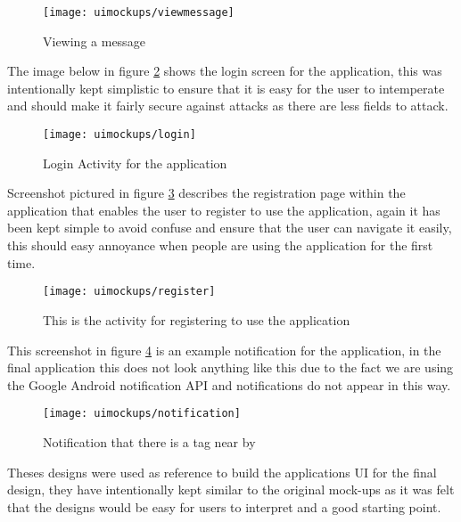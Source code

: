 \begin{figure}[htb!]
    \centering
    \texttt{[image: uimockups/viewmessage]}
    \caption{Viewing a message}
    \label{fig:viewing_message_image}
\end{figure} 

\noindent
The image below in figure \ref{fig:login_activity_image} shows the login screen for the application, this was intentionally kept simplistic to ensure that it is easy for the user to intemperate and should make it fairly secure against attacks as there are less fields to attack.\\

\begin{figure}[htb!]
    \centering
    \texttt{[image: uimockups/login]}
    \caption{Login Activity for the application}
    \label{fig:login_activity_image}
\end{figure} 

\noindent
Screenshot pictured in figure \ref{fig:registration_activity_image} describes the registration page within the application that enables the user to register to use the application, again it has been kept simple to avoid confuse and ensure that the user can navigate it easily, this should easy annoyance when people are using the application for the first time.\\

\begin{figure}[htb!]
    \centering
    \texttt{[image: uimockups/register]}
    \caption{This is the activity for registering to use the application}
    \label{fig:registration_activity_image}
\end{figure} 

\noindent
This screenshot in figure \ref{fig:notification_image} is an example notification for the application, in the final application this does not look anything like this due to the fact we are using the Google Android notification API and notifications do not appear in this way.\\

\begin{figure}[htb!]
    \centering
    \texttt{[image: uimockups/notification]}
    \caption{Notification that there is a tag near by}
    \label{fig:notification_image}
\end{figure} 

\noindent
Theses designs were used as reference to build the applications UI for the final design, they have intentionally kept similar to the original mock-ups as it was felt that the designs would be easy for users to interpret and a good starting point.\\

